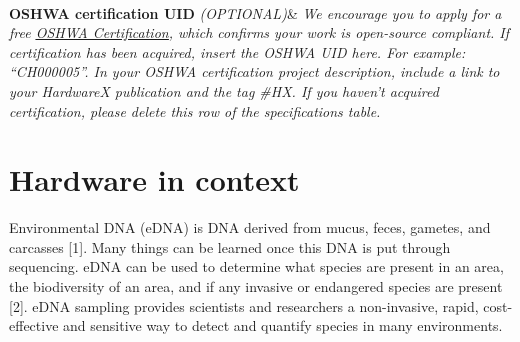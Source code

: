 \documentclass[11pt, letterpaper]{article}
\begin{document}
\begin{flushleft}
\begin{tabu}
  \\
\hline \textbf{OSHWA certification UID} \vskip 0.1cm {\it (OPTIONAL)}&
{\it We encourage you to apply for a free \href{https://certification.oshwa.org/}{\underline{OSHWA Certification}}, which confirms your work is open-source compliant.
\vskip 0.2cm
If certification has been acquired, insert the OSHWA UID here. For example: “CH000005”. In your OSHWA certification project description, include a link to your HardwareX publication and the tag \#HX.
\vskip 0.2cm
If you haven’t acquired certification, please delete this row of the specifications table.}
\\\hline
\end{tabu}
\end{flushleft}



\newpage
\section{Hardware in context}

Environmental DNA (eDNA) is DNA derived from mucus, feces, gametes, and carcasses [1]. Many things can be learned once this DNA is put through sequencing. eDNA can be used to determine what species are present in an area, the biodiversity of an area, and if any invasive or endangered species are present [2]. eDNA sampling provides scientists and researchers a non-invasive, rapid, cost-effective and sensitive way to detect and quantify species in many environments.  
 
\end{document}
